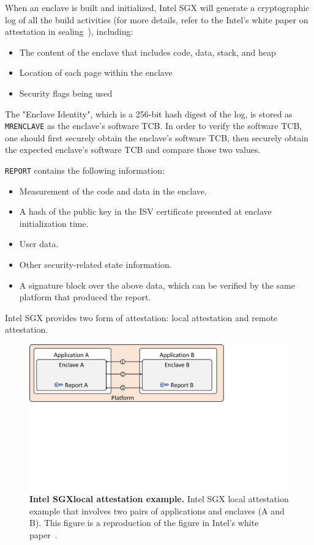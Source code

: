  When an enclave is built and initialized, Intel SGX will generate a cryptographic log of all the build activities (for more details, refer to the Intel's white paper on attestation in sealing~\cite{attestation_primitive_all}), including:

\begin{itemize}
  \item The content of the enclave that includes code, data, stack, and heap
  \item Location of each page within the enclave
  \item Security flags being used
\end{itemize}
    
The "Enclave Identity", which is a 256-bit hash digest of the log, is stored as \texttt{MRENCLAVE} as the enclave's software TCB. In order to verify the software TCB, one should first securely obtain the enclave's software TCB, then securely obtain the expected enclave's software TCB and compare those two values.

 \texttt{REPORT} contains the following information:

\begin{itemize}
  \item Measurement of the code and data in the enclave.
  \item A hash of the public key in the ISV certificate presented at enclave initialization time.
  \item User data.
  \item Other security-related state information.
  \item A signature block over the above data, which can be verified by the same platform that produced the report.
\end{itemize}

Intel SGX provides two form of attestation: local attestation and remote attestation.


\begin{figure}[t]
  \centering
    \includegraphics[trim={0 11cm 8cm 0},clip,width=0.9\linewidth]{chapters/background/figures/local_attestation.pdf}
    \caption[Intel SGX local attestation example]{\textbf{Intel SGXlocal attestation example.} Intel SGX local attestation example that involves two pairs of applications and enclaves (A and B). This figure is a reproduction of the figure in Intel's white paper~\cite{attestation_primitive_all}.}
    \label{fig:la_bg}
\end{figure}

